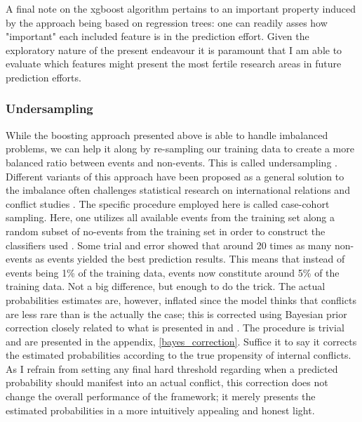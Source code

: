 \documentclass[a4paper]{article}
\begin{document}
A final note on the xgboost algorithm pertains to an important property induced by the approach being based on regression trees: one can readily asses how "important" each included feature is in the prediction effort. Given the exploratory nature of the present endeavour it is paramount that I am able to evaluate which features might present the most fertile research areas in future prediction efforts.\par

\subsubsection{Undersampling}

While the boosting approach presented above is able to handle imbalanced problems, we can help it along by re-sampling our training data to create a more balanced ratio between events and non-events. This is called undersampling \citep[1266-1267]{He_2008}. Different variants of this approach have been proposed as a general solution to the imbalance often challenges statistical research on international relations and conflict studies \cite{King_Zeng_2001, king_zeng_2001b}. The specific procedure employed here is called case-cohort sampling. Here, one utilizes all available events from the training set along a random subset of no-events from the training set in order to construct the classifiers used \citep[142]{King_Zeng_2001}. Some trial and error showed that around 20 times as many non-events as events yielded the best prediction results. This means that instead of events being 1\% of the training data, events now constitute around 5\% of the training data. Not a big difference, but enough to do the trick. The actual probabilities estimates are, however, inflated since the model thinks that conflicts are less rare than is the actually the case; this is corrected using Bayesian prior correction closely related to what is presented in \cite{King_Zeng_2001, king_zeng_2001b} and \cite{Goldstone_2010}. The procedure is trivial and are presented in the appendix, \autoref{bayes_correction}. Suffice it to say it corrects the estimated probabilities according to the true propensity of internal conflicts. As I refrain from setting any final hard threshold regarding when a predicted probability should manifest into an actual conflict, this correction does not change the overall performance of the framework; it merely presents the estimated probabilities in a more intuitively appealing and honest light.\par
\end{document}
